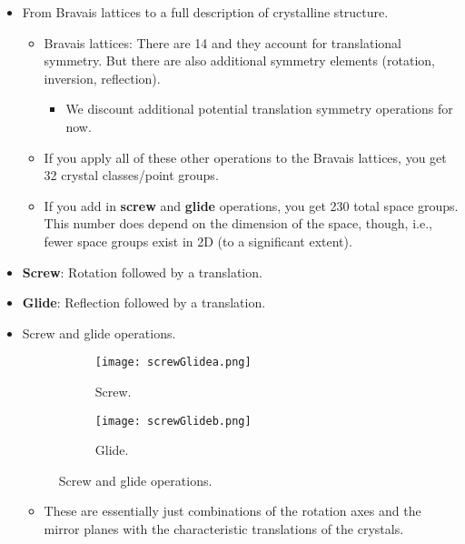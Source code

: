 \documentclass[../notes.tex]{subfiles}
\begin{document}
\begin{itemize}
\begin{itemize}
    \end{itemize}
    \item From Bravais lattices to a full description of crystalline structure.
    \begin{itemize}
        \item Bravais lattices: There are 14 and they account for translational symmetry. But there are also additional symmetry elements (rotation, inversion, reflection).
        \begin{itemize}
            \item We discount additional potential translation symmetry operations for now.
        \end{itemize}
        \item If you apply all of these other operations to the Bravais lattices, you get 32 crystal classes/point groups.
        \item If you add in \textbf{screw} and \textbf{glide} operations, you get 230 total space groups. This number does depend on the dimension of the space, though, i.e., fewer space groups exist in 2D (to a significant extent).
    \end{itemize}
    \item \textbf{Screw}: Rotation followed by a translation.
    \item \textbf{Glide}: Reflection followed by a translation.
    \item Screw and glide operations.
    \begin{figure}[h!]
        \centering
        \begin{subfigure}[b]{0.35\linewidth}
            \centering
            \texttt{[image: screwGlidea.png]}
            \caption{Screw.}
            \label{fig:screwGlidea}
        \end{subfigure}
        \begin{subfigure}[b]{0.35\linewidth}
            \centering
            \texttt{[image: screwGlideb.png]}
            \caption{Glide.}
            \label{fig:screwGlideb}
        \end{subfigure}
        \caption{Screw and glide operations.}
        \label{fig:screwGlide}
    \end{figure}
    \begin{itemize}
        \item These are essentially just combinations of the rotation axes and the mirror planes with the characteristic translations of the crystals.
    \end{itemize}

\end{itemize}
\end{document}
